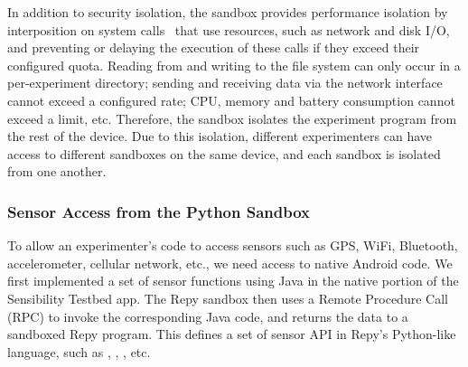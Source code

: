 In addition to security isolation,
the sandbox provides performance isolation by
interposition on system calls~\cite{garfinkel2003traps} that 
use resources, such as network and disk I/O, and preventing 
or delaying the execution of these calls if they exceed 
their configured quota. 
Reading from and writing to the file system can
only occur in a per-experiment directory; sending and receiving
data via the network interface cannot exceed a configured rate;
CPU, memory and battery consumption cannot exceed a limit, etc.
Therefore, the sandbox isolates the experiment program from 
the rest of the device. Due to this isolation, different experimenters
can have access to different sandboxes on the same device,
and each sandbox is isolated from one another.

\subsubsection{Sensor Access from the Python Sandbox}

To allow an experimenter's code to access sensors such as 
GPS, WiFi, Bluetooth, accelerometer, cellular network, etc., we  
need access to native Android code. We first implemented a set of sensor functions using
Java in the native portion of the Sensibility Testbed app. The Repy 
sandbox then uses a Remote Procedure Call (RPC) to invoke the
corresponding Java code, and returns the data 
to a sandboxed Repy program. This defines a set of sensor API in 
Repy's Python-like language, such as , 
, , etc. 

